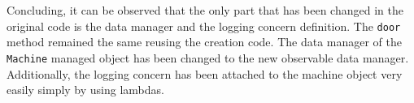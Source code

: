






Concluding, it can be observed that the only part that has been changed in the original code is the data manager and the logging concern definition.
The \texttt{door} method remained the same reusing the creation code.
The data manager of the \texttt{Machine} managed object has been changed to the new observable data manager.
Additionally, the logging concern has been attached to the machine object very easily simply by using lambdas.

